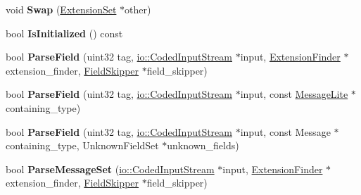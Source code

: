 \begin{DoxyCompactItemize}
\mbox{\label{classgoogle_1_1protobuf_1_1internal_1_1ExtensionSet_aa0ccc140948b5994f925f6efe413a653}} 
void {\bfseries Swap} (\hyperlink{classgoogle_1_1protobuf_1_1internal_1_1ExtensionSet}{Extension\+Set} $\ast$other)
\item 
\mbox{\label{classgoogle_1_1protobuf_1_1internal_1_1ExtensionSet_a265b7a08f8f53cf4d1d10e77921678a9}} 
bool {\bfseries Is\+Initialized} () const
\item 
\mbox{\label{classgoogle_1_1protobuf_1_1internal_1_1ExtensionSet_a88887505dd61a26e25504101f303c21c}} 
bool {\bfseries Parse\+Field} (uint32 tag, \hyperlink{classgoogle_1_1protobuf_1_1io_1_1CodedInputStream}{io\+::\+Coded\+Input\+Stream} $\ast$input, \hyperlink{classgoogle_1_1protobuf_1_1internal_1_1ExtensionFinder}{Extension\+Finder} $\ast$extension\+\_\+finder, \hyperlink{classgoogle_1_1protobuf_1_1internal_1_1FieldSkipper}{Field\+Skipper} $\ast$field\+\_\+skipper)
\item 
\mbox{\label{classgoogle_1_1protobuf_1_1internal_1_1ExtensionSet_ac0136877b8f41b01e665cd0ff9b6c9d7}} 
bool {\bfseries Parse\+Field} (uint32 tag, \hyperlink{classgoogle_1_1protobuf_1_1io_1_1CodedInputStream}{io\+::\+Coded\+Input\+Stream} $\ast$input, const \hyperlink{classgoogle_1_1protobuf_1_1MessageLite}{Message\+Lite} $\ast$containing\+\_\+type)
\item 
\mbox{\label{classgoogle_1_1protobuf_1_1internal_1_1ExtensionSet_a3b2da67bab5bfc627e68ce248c86ec61}} 
bool {\bfseries Parse\+Field} (uint32 tag, \hyperlink{classgoogle_1_1protobuf_1_1io_1_1CodedInputStream}{io\+::\+Coded\+Input\+Stream} $\ast$input, const Message $\ast$containing\+\_\+type, Unknown\+Field\+Set $\ast$unknown\+\_\+fields)
\item 
\mbox{\label{classgoogle_1_1protobuf_1_1internal_1_1ExtensionSet_a7d60bd396981b247120e140fdf238476}} 
bool {\bfseries Parse\+Message\+Set} (\hyperlink{classgoogle_1_1protobuf_1_1io_1_1CodedInputStream}{io\+::\+Coded\+Input\+Stream} $\ast$input, \hyperlink{classgoogle_1_1protobuf_1_1internal_1_1ExtensionFinder}{Extension\+Finder} $\ast$extension\+\_\+finder, \hyperlink{classgoogle_1_1protobuf_1_1internal_1_1FieldSkipper}{Field\+Skipper} $\ast$field\+\_\+skipper)

\end{DoxyCompactItemize}
